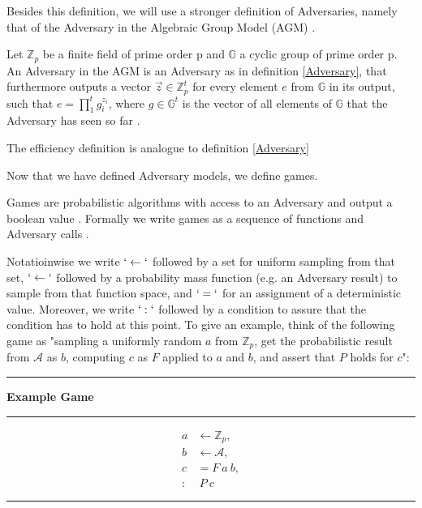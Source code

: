 Besides this definition, we will use a stronger definition of Adversaries, namely that of the Adversary in the Algebraic Group Model (AGM) \parencite{AGM}.

\begin{definition}
    Let $\mathbb{Z}_p$ be a finite field of prime order p and $\mathbb{G}$ a cyclic group of prime order p. An Adversary in the AGM is an Adversary as in definition \ref{Adversary}, that furthermore outputs a vector $\vec{z} \in \mathbb{Z}_p^t$ for every element $e$ from $\mathbb{G}$ in its output, such that $e = \prod_{1}^{t} g_i^{z_i}$, where $g\in \mathbb{G}^t$ is the vector of all elements of $\mathbb{G}$ that the Adversary has seen so far
    \parencite{AGM}. 

    The efficiency definition is analogue to definition \ref*{Adversary}
\end{definition}

Now that we have defined Adversary models, we define games. 

\begin{definition}[games]
Games are probabilistic algorithms with access to an Adversary and output a boolean value \parencite{boneh_shoup}. Formally we write games as a sequence of functions and Adversary calls \parencite{boneh_shoup}.
\end{definition}

Notatioinwise we write $`\leftarrow`$ followed by a set for uniform sampling from that set, $`\leftarrow`$ followed by a probability mass function (e.g. an Adversary result) to sample from that function space, and $`=`$ for an assignment of a deterministic value. Moreover, we write $`:`$ followed by a condition to assure that the condition has to hold at this point. To give an example, think of the following game as "sampling a uniformly random $a$ from $\mathbb{Z}_p$, get the probabilistic result from $\mathcal{A}$ as $b$, computing $c$ as $F$ applied to $a$ and $b$, and assert that $P$ holds for $c$":
\par\noindent\rule{\textwidth}{1pt}
\textbf{Example Game}
\par\noindent\rule{\textwidth}{0.5pt}
\begin{equation*}
    \begin{split}
        a & \leftarrow \mathbb{Z}_p, \\
        b & \leftarrow \mathcal{A}, \\
        c & = F\ a\ b, \\
        : &\ P\ c
    \end{split}
\end{equation*}
\par\noindent\rule{\textwidth}{1pt}
